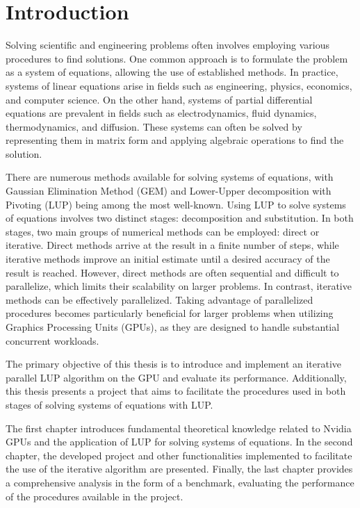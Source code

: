 \chapter*{Introduction}		 		 		 %

Solving scientific and engineering problems often involves employing various procedures to find solutions.
One common approach is to formulate the problem as a system of equations, allowing the use of established methods.
In practice, systems of linear equations arise in fields such as engineering, physics, economics, and computer science.
On the other hand, systems of partial differential equations are prevalent in fields such as electrodynamics, fluid dynamics, thermodynamics, and diffusion.
These systems can often be solved by representing them in matrix form and applying algebraic operations to find the solution.

There are numerous methods available for solving systems of equations, with Gaussian Elimination Method (GEM) and Lower-Upper decomposition with Pivoting (LUP) being among the most well-known.
Using LUP to solve systems of equations involves two distinct stages: decomposition and substitution.
In both stages, two main groups of numerical methods can be employed: direct or iterative.
Direct methods arrive at the result in a finite number of steps, while iterative methods improve an initial estimate until a desired accuracy of the result is reached.
However, direct methods are often sequential and difficult to parallelize, which limits their scalability on larger problems.
In contrast, iterative methods can be effectively parallelized.
Taking advantage of parallelized procedures becomes particularly beneficial for larger problems when utilizing Graphics Processing Units (GPUs), as they are designed to handle substantial concurrent workloads.

The primary objective of this thesis is to introduce and implement an iterative parallel LUP algorithm on the GPU and evaluate its performance.
Additionally, this thesis presents a project that aims to facilitate the procedures used in both stages of solving systems of equations with LUP.

The first chapter introduces fundamental theoretical knowledge related to Nvidia GPUs and the application of LUP for solving systems of equations.
In the second chapter, the developed project and other functionalities implemented to facilitate the use of the iterative algorithm are presented.
Finally, the last chapter provides a comprehensive analysis in the form of a benchmark, evaluating the performance of the procedures available in the project.